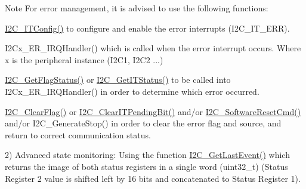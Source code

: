\begin{DoxyItemize}
\begin{DoxyItemize}
\begin{DoxyNote}{Note}
For error management, it is advised to use the following functions\+:
\begin{DoxyItemize}
\item \hyperlink{agilefox_2library_2src_2stm32f10x__i2c_8c_a7a87692ee16d1d4ec7fcd88e24f0a197}{I2\+C\+\_\+\+I\+T\+Config()} to configure and enable the error interrupts (I2\+C\+\_\+\+I\+T\+\_\+\+E\+RR).
\item I2\+Cx\+\_\+\+E\+R\+\_\+\+I\+R\+Q\+Handler() which is called when the error interrupt occurs. Where x is the peripheral instance (I2\+C1, I2\+C2 ...)
\item \hyperlink{agilefox_2library_2src_2stm32f10x__i2c_8c_a9aefe6c49ded931ae087ff44a47b87f3}{I2\+C\+\_\+\+Get\+Flag\+Status()} or \hyperlink{agilefox_2library_2src_2stm32f10x__i2c_8c_a93e6ac0ec7f3d0adbcd7835fcb4431dc}{I2\+C\+\_\+\+Get\+I\+T\+Status()} to be called into I2\+Cx\+\_\+\+E\+R\+\_\+\+I\+R\+Q\+Handler() in order to determine which error occurred.
\item \hyperlink{agilefox_2library_2src_2stm32f10x__i2c_8c_a8ac0c028a3f185e1b362aba36865e78e}{I2\+C\+\_\+\+Clear\+Flag()} or \hyperlink{agilefox_2library_2src_2stm32f10x__i2c_8c_a21e5d72db8f1d47f88d00f77cd85d2ae}{I2\+C\+\_\+\+Clear\+I\+T\+Pending\+Bit()} and/or \hyperlink{group___i2_c___exported___functions_ga1289c908aeb882443aba323b459c638b}{I2\+C\+\_\+\+Software\+Reset\+Cmd()} and/or I2\+C\+\_\+\+Generate\+Stop() in order to clear the error flag and source, and return to correct communication status.
\end{DoxyItemize}
\end{DoxyNote}
2) Advanced state monitoring\+: Using the function \hyperlink{group___i2_c___exported___functions_ga29237aea9b5a3ead33167e1d027e9f1a}{I2\+C\+\_\+\+Get\+Last\+Event()} which returns the image of both status registers in a single word (uint32\+\_\+t) (Status Register 2 value is shifted left by 16 bits and concatenated to Status Register 1).
\end{DoxyItemize}
\end{DoxyItemize}

